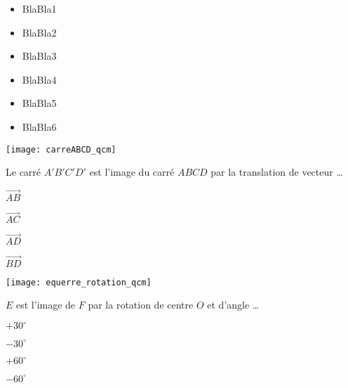 \begin{acquis}
\begin{itemize}
\item BlaBla1
\item BlaBla2
\item BlaBla3
\item BlaBla4
\item BlaBla5
\item BlaBla6
\end{itemize}
\end{acquis}


\begin{QCM}
  \begin{GroupeQCM}
    \begin{exercice}
      \begin{center} \texttt{[image: carreABCD\_qcm]} \end{center}
      \begin{center} Le carré $A'B'C'D'$ est l'image du carré $ABCD$ par la translation de vecteur \ldots \end{center}
      \begin{ChoixQCM}{4}
      \item $\overrightarrow{AB}$
      \item $\overrightarrow{AC}$
      \item $\overrightarrow{AD}$
      \item $\overrightarrow{BD}$
      \end{ChoixQCM}
\begin{corrige}
   \end{corrige}
    \end{exercice}
    
    
    \begin{exercice}
      \begin{center} \texttt{[image: equerre\_rotation\_qcm]} \end{center}
      \begin{center} $E$ est l'image de $F$ par la rotation de centre $O$ et d'angle \ldots \end{center}
      \begin{ChoixQCM}{4}
      \item $+ 30^\circ$
      \item $- 30^\circ$
      \item $+ 60^\circ$
      \item $- 60^\circ$
      \end{ChoixQCM}
\begin{corrige}
   \end{corrige}
    \end{exercice}
    

\end{GroupeQCM}
\end{QCM}

